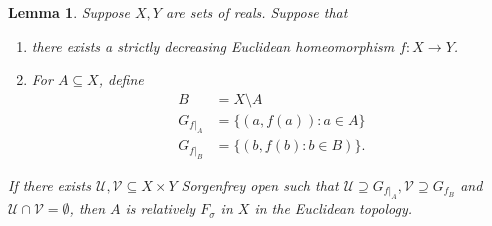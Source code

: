 \documentclass[11pt]{amsart}
\newtheorem{lemma}[theorem]{Lemma}
\theoremstyle{definition}
\theoremstyle{remark}
\newcommand{\Vv}{\mathcal{V}}
\newcommand{\Uu}{\mathcal{U}}
\theoremstyle{plain}
\begin{document}


\begin{lemma}\label{lem:fsigma}
    Suppose $X,Y$ are sets of reals. Suppose that
    \begin{enumerate}
        \item there exists a strictly decreasing Euclidean homeomorphism $f:X \to Y$.
        \item For $A\subseteq X$, define
        \begin{align*}
        B&=X\setminus A\\
        G_{f|_{A}}&= \{(a,f(a)):a\in A\} \\
        G_{f|_{B}}&= \{(b,f(b):b\in B)\}.
    \end{align*}
    \end{enumerate}
    If there exists $\Uu,\Vv \subseteq X\times Y$ Sorgenfrey open such that $\Uu\supseteq G_{f|_A}, \Vv\supseteq G_{f_B}$ and $\Uu\cap\Vv=\emptyset$, then $A$ is relatively $F_\sigma$ in $X$ in the Euclidean topology.
\end{lemma}
\end{document}
